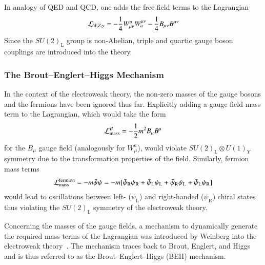 In analogy of QED and QCD, one adds the free field terms to the Lagrangian
\begin{align*}
  \mathcal{L}_{W, Z, \gamma} =
  - \frac{1}{4} W_{\mu\nu}^a W^{\mu\nu}_a
  - \frac{1}{4} B_{\mu\nu} B^{\mu\nu}
\end{align*}
Since the $SU(2)_{\text{L}}$ group is non-Abelian, triple and quartic gauge
boson couplings are introduced into the theory.


\subsubsection{The Brout--Englert--Higgs Mechanism}

In the context of the electroweak theory, the non-zero masses of the gauge
bosons and the fermions have been ignored thus far. Explicitly adding a gauge
field mass term to the Lagrangian, which would take the form
\begin{align*}
  \mathcal{L}_{\text{mass}}^{B} = -\frac{1}{2} m^2 B_\mu B^\mu
\end{align*}
for the $B_\mu$ gauge field (analogously for $W_\mu^a$), would violate
$SU(2)_{\text{L}} \otimes U(1)_Y$ symmetry due to the transformation properties
of the field. Similarly, fermion mass terms
\begin{align*}
  \mathcal{L}_{\text{mass}}^{\text{fermion}} = - m \bar{\psi} \psi = - m [ \bar{\psi}_\text{R} \psi_\text{R} + \bar{\psi}_\text{L} \psi_\text{L} + \bar{\psi}_\text{R} \psi_\text{L} + \bar{\psi}_\text{L} \psi_\text{R}]
\end{align*}
would lead to oscillations between left- ($\psi_{\text{L}}$) and right-handed
($\psi_{\text{R}}$) chiral states thus violating the $SU(2)_{\text{L}}$ symmetry
of the electroweak theory.

Concerning the masses of the gauge fields, a mechanism to dynamically generate
the required mass terms of the Lagrangian was introduced by Weinberg into the
electroweak theory~\cite{Weinberg:1967tq}. The mechanism traces back to Brout,
Englert, and Higgs~\cite{Englert:1964et,Higgs:1964pj} and is thus referred to as
the Brout--Englert--Higgs (BEH) mechanism.

